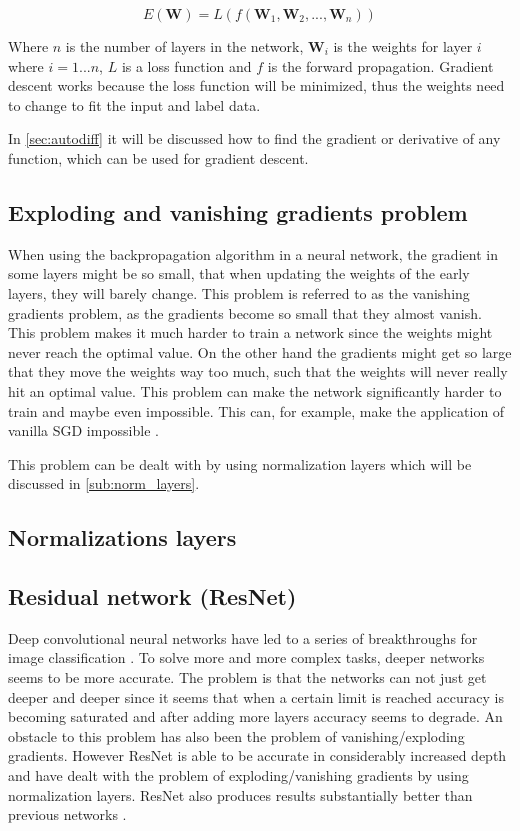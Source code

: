 $$E(\bm{W}) = L(f(\bm{W}_1, \bm{W}_2, ..., \bm{W}_n))$$

Where $n$ is the number of layers in the network, $\bm{W}_i$ is the weights for layer $i$ where $i = 1...n$, $L$ is a loss function and $f$ is the forward propagation.
Gradient descent works because the loss function will be minimized, thus the weights need to change to fit the input and label data.

In \autoref{sec:autodiff} it will be discussed how to find the gradient or derivative of any function, which can be used for gradient descent.

\subsection{Exploding and vanishing gradients problem}

When using the backpropagation algorithm in a neural network, the gradient in some layers might be so small, that when updating the weights of the early layers, they will barely change. This problem is referred to as the vanishing gradients problem, as the gradients become so small that they almost vanish.
This problem makes it much harder to train a network since the weights might never reach the optimal value.
On the other hand the gradients might get so large that they move the weights way too much, such that the weights will never really hit an optimal value.
This problem can make the network significantly harder to train and maybe even impossible. This can, for example, make the application of vanilla SGD impossible \cite{exploding_gradients}.

This problem can be dealt with by using normalization layers which will be discussed in \autoref{sub:norm_layers}.



\subsection{Normalizations layers}%
\label{sub:norm_layers}


\subsection{Residual network (ResNet)}

Deep convolutional neural networks have led to a series of breakthroughs for image classification \cite{resnet}.
To solve more and more complex tasks, deeper networks seems to be more accurate.
The problem is that the networks can not just get deeper and deeper since it seems that when a certain limit is reached accuracy is becoming saturated and after adding more layers accuracy seems to degrade.
An obstacle to this problem has also been the problem of vanishing/exploding gradients.
However ResNet is able to be accurate in considerably increased depth and have dealt with the problem of exploding/vanishing gradients by using normalization layers. ResNet also produces results substantially better than previous networks \cite{resnet}.

